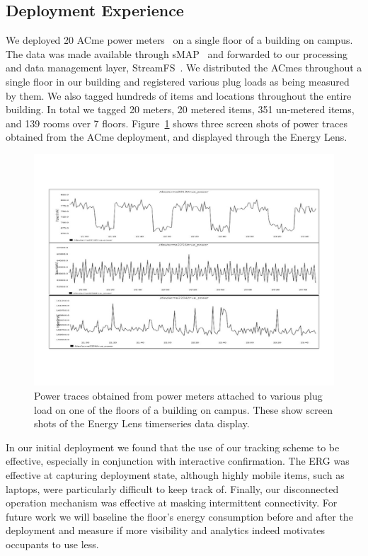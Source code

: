 \subsection{Deployment Experience}
\label{sec:depexp}

We deployed 20 ACme power meters~\cite{acme} on a single floor of a building on campus.  The data was made available through
sMAP~\cite{smap} and forwarded to our processing and data management layer, StreamFS~\cite{streamfs}.  We distributed
the ACmes throughout a single floor in our building and registered various plug loads as being measured by them.  We also tagged
hundreds of items and locations throughout the entire building.  In total we tagged 20 meters, 20 metered items, 351 un-metered items,
 and 139 rooms over 7 floors.  Figure~\ref{fig:tsdata} shows three screen shots of power traces obtained from the ACme deployment, and displayed
 through the Energy Lens. 

\begin{figure}[htb!]
\begin{center}
\includegraphics[scale=0.33]{figs/graphs_screen}
\caption{Power traces obtained from power meters attached to various plug load on one of the floors of
a building on campus.  These show screen shots of the Energy Lens timerseries data display.}
\label{fig:tsdata}
\end{center}
\end{figure}

In our initial deployment we found that the use of our tracking scheme to be effective, especially in conjunction with
interactive confirmation.  The ERG was effective at capturing deployment state, although highly mobile items, such as laptops,
were particularly difficult to keep track of.  Finally, our disconnected operation mechanism was effective at masking 
intermittent connectivity.  For future work we will baseline the floor's energy consumption before and after the deployment 
and measure if more visibility and analytics indeed motivates occupants to use less.

